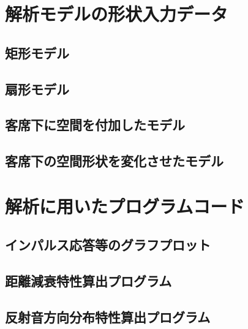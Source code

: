 \chapter{解析モデルの形状入力データ}
\section{矩形モデル}
\section{扇形モデル}
\section{客席下に空間を付加したモデル}
\section{客席下の空間形状を変化させたモデル}
\chapter{解析に用いたプログラムコード}
\section{インパルス応答等のグラフプロット}
\section{距離減衰特性算出プログラム}
\section{反射音方向分布特性算出プログラム}